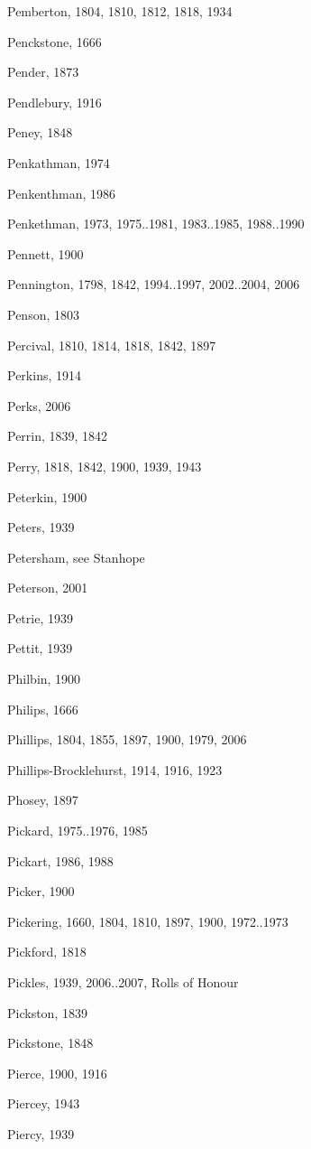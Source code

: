 {\begin{theindex}
\item Pemberton, 1804, 1810, 1812, 1818, 1934
\item Penckstone, 1666
\item Pender, 1873
\item Pendlebury, 1916
\item Peney, 1848
\item Penkathman, 1974
\item Penkenthman, 1986
\item Penkethman, 1973, 1975..1981, 1983..1985, 1988..1990
\item Pennett, 1900
\item Pennington, 1798, 1842, 1994..1997, 2002..2004, 2006
\item Penson, 1803
\item Percival, 1810, 1814, 1818, 1842, 1897
\item Perkins, 1914
\item Perks, 2006
\item Perrin, 1839, 1842
\item Perry, 1818, 1842, 1900, 1939, 1943
\item Peterkin, 1900
\item Peters, 1939
\item Petersham, see Stanhope
\item Peterson, 2001
\item Petrie, 1939
\item Pettit, 1939
\item Philbin, 1900
\item Philips, 1666
\item Phillips, 1804, 1855, 1897, 1900, 1979, 2006
\item Phillips-Brocklehurst, 1914, 1916, 1923
\item Phosey, 1897
\item Pickard, 1975..1976, 1985
\item Pickart, 1986, 1988
\item Picker, 1900
\item Pickering, 1660, 1804, 1810, 1897, 1900, 1972..1973
\item Pickford, 1818
\item Pickles, 1939, 2006..2007, Rolls of Honour
\item Pickston, 1839
\item Pickstone, 1848
\item Pierce, 1900, 1916
\item Piercey, 1943
\item Piercy, 1939

\end{theindex}}
